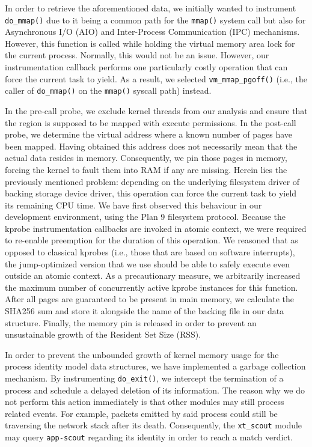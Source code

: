 In order to retrieve the aforementioned data, we initially wanted to instrument
\texttt{do\_mmap()} due to it being a common path for the \texttt{mmap()} system
call but also for Asynchronous I/O (AIO) and Inter-Process Communication (IPC)
mechanisms. However, this function is called while holding the virtual memory
area lock for the current process. Normally, this would not be an issue.
However, our instrumentation callback performs one particularly costly operation
that can force the current task to yield. As a result, we selected
\texttt{vm\_mmap\_pgoff()} (i.e., the caller of \texttt{do\_mmap()} on the
\texttt{mmap()} syscall path) instead.

In the pre-call probe, we exclude kernel threads from our analysis and ensure
that the region is supposed to be mapped with execute permissions. In the
post-call probe, we determine the virtual address where a known number of pages
have been mapped. Having obtained this address does not necessarily mean that
the actual data resides in memory. Consequently, we pin those pages in memory,
forcing the kernel to fault them into RAM if any are missing. Herein lies the
previously mentioned problem: depending on the underlying filesystem driver of
backing storage device driver, this operation can force the current task to
yield its remaining CPU time. We have first observed this behaviour in our
development environment, using the Plan 9 filesystem protocol. Because the
kprobe instrumentation callbacks are invoked in atomic context, we were required
to re-enable preemption for the duration of this operation. We reasoned that as
opposed to classical kprobes (i.e., those that are based on software
interrupts), the jump-optimized version that we use should be able to safely
execute even outside an atomic context. As a precautionary measure, we
arbitrarily increased the maximum number of concurrently active kprobe instances
for this function. After all pages are guaranteed to be present in main memory,
we calculate the SHA256 sum and store it alongside the name of the backing file
in our data structure. Finally, the memory pin is released in order to prevent
an unsustainable growth of the Resident Set Size (RSS).

In order to prevent the unbounded growth of kernel memory usage for the process
identity model data structures, we have implemented a garbage collection
mechanism. By instrumenting \texttt{do\_exit()}, we intercept the termination of
a process and schedule a delayed deletion of its information. The reason why we
do not perform this action immediately is that other modules may still process
related events. For example, packets emitted by said process could still be
traversing the network stack after its death. Consequently, the
\texttt{xt\_scout} module may query \texttt{app-scout} regarding its identity in
order to reach a match verdict.


